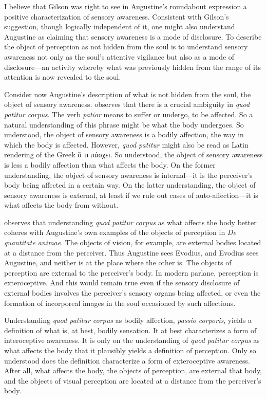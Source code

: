 \documentclass[12pt]{article}
\begin{document}
I believe that Gilson was right to see in Augustine's roundabout expression a positive characterization of sensory awareness. Consistent with Gilson's suggestion, though logically independent of it, one might also understand Augustine as claiming that sensory awareness is a mode of disclosure. To describe the object of perception as not hidden from the soul is to understand sensory awareness not only as the soul's attentive vigilance but also as a mode of disclosure---an activity whereby what was previously hidden from the range of its attention is now revealed to the soul.

Consider now Augustine's description of what is not hidden from the soul, the object of sensory awareness. \citet[274--278]{Brittain:2002hl} observes that there is a crucial ambiguity in \emph{quod patitur corpus}. The verb \emph{patior} means to suffer or undergo, to be affected. So a natural understanding of this phrase might be what the body undergoes. So understood, the object of sensory awareness is a bodily affection, the way in which the body is affected. However, \emph{quod patitur} might also be read as Latin rendering of the Greek {\sbl ὅ τι πάσχει}. So understood, the object of sensory awareness is less a bodily affection than what affects the body. On the former understanding, the object of sensory awareness is internal---it is the perceiver's body being affected in a certain way. On the latter understanding, the object of sensory awareness is external, at least if we rule out cases of auto-affection---it is what affects the body from without. 

\citet[]{Brittain:2002hl} observes that understanding \emph{quod patitur corpus} as what affects the body better coheres with Augustine's own examples of the objects of perception in \emph{De quantitate animae}. The objects of vision, for example, are external bodies located at a distance from the perceiver. Thus Augustine sees Evodius, and Evodius sees Augustine, and neither is at the place where the other is. The objects of perception are external to the perceiver's body. In modern parlane, perception is exteroceptive. And this would remain true even if the sensory disclosure of external bodies involves the perceiver's sensory organs being affected, or even the formation of incorporeal images in the soul occasioned by such affections. 

Understanding \emph{quod patitur corpus} as bodily affection, \emph{passio corporis}, yields a definition of what is, at best, bodily sensation. It at best characterizes a form of interoceptive awareness. It is only on the understanding of \emph{quod patitur corpus} as what affects the body that it plausibly yields a definition of perception. Only so understood does the definition characterize a form of exteroceptive awareness. After all, what affects the body, the objects of perception, are external that body, and the objects of visual perception are located at a distance from the perceiver's body.
\end{document}
